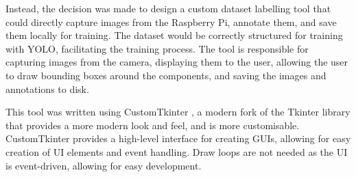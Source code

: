 Instead, the decision was made to design a custom dataset labelling tool that could directly capture images from the Raspberry Pi, annotate them, and save them locally for training. The dataset would be correctly structured for training with YOLO, facilitating the training process. The tool is responsible for capturing images from the camera, displaying them to the user, allowing the user to draw bounding boxes around the components, and saving the images and annotations to disk.

This tool was written using CustomTkinter \cite{customtkinter}, a modern fork of the Tkinter library that provides a more modern look and feel, and is more customisable. CustomTkinter provides a high-level interface for creating GUIs, allowing for easy creation of UI elements and event handling. Draw loops are not needed as the UI is event-driven, allowing for easy development.

